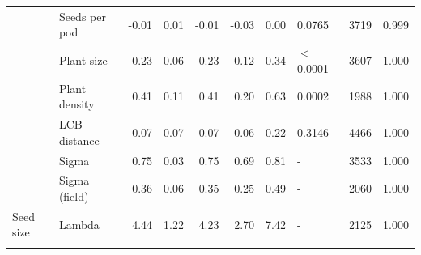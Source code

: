 \begin{longtable}{l|l|r|r|r|r|r|l|r|r}
\cline{2-10}
 & Seeds per pod & -0.01 & 0.01 & -0.01 & -0.03 & 0.00 & 0.0765 & 3719 & 0.999\\
\cline{2-10}
 & Plant size & 0.23 & 0.06 & 0.23 & 0.12 & 0.34 & $<$0.0001 & 3607 & 1.000\\
\cline{2-10}
 & Plant density & 0.41 & 0.11 & 0.41 & 0.20 & 0.63 & 0.0002 & 1988 & 1.000\\
\cline{2-10}
 & LCB distance & 0.07 & 0.07 & 0.07 & -0.06 & 0.22 & 0.3146 & 4466 & 1.000\\
\cline{2-10}
 & Sigma & 0.75 & 0.03 & 0.75 & 0.69 & 0.81 & - & 3533 & 1.000\\
\cline{2-10}
 & Sigma (field) & 0.36 & 0.06 & 0.35 & 0.25 & 0.49 & - & 2060 & 1.000\\
\cline{2-10}
\multirow{-9}{*}{\raggedright\arraybackslash Seed size} & Lambda & 4.44 & 1.22 & 4.23 & 2.70 & 7.42 & - & 2125 & 1.000\\
\hline
\label{tab:seedCoefs}
\end{longtable}
\endgroup{}

